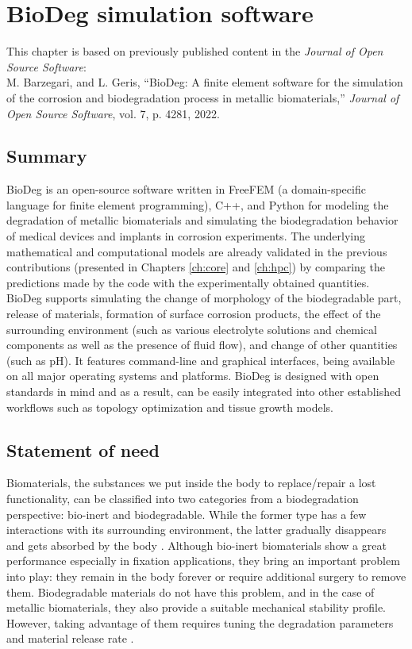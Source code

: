 \chapter{BioDeg simulation software}\label{ch:biodeg}


\begin{tcolorbox}
This chapter is based on previously published content in the \textit{Journal of Open Source Software}:\\
M. Barzegari, and L. Geris, ``BioDeg: A finite element software for the simulation of the corrosion and biodegradation process in metallic biomaterials,'' \textit{Journal of Open Source Software}, vol. 7, p. 4281, 2022.
\end{tcolorbox}

\section{Summary}

BioDeg is an open-source software written in FreeFEM (a domain-specific language for finite element programming), C++, and Python for modeling the degradation of metallic biomaterials and simulating the biodegradation behavior of medical devices and implants in corrosion experiments. The underlying mathematical and computational models are already validated in the previous contributions \cite{Barzegari2021, Barzegari2022} (presented in Chapters \ref{ch:core} and \ref{ch:hpc}) by comparing the predictions made by the code with the experimentally obtained quantities. BioDeg supports simulating the change of morphology of the biodegradable part, release of materials, formation of surface corrosion products, the effect of the surrounding environment (such as various electrolyte solutions and chemical components as well as the presence of fluid flow), and change of other quantities (such as pH). It features command-line and graphical interfaces, being available on all major operating systems and platforms. BioDeg is designed with open standards in mind and as a result, can be easily integrated into other established workflows such as topology optimization and tissue growth models.

\section{Statement of need}

Biomaterials, the substances we put inside the body to replace/repair a lost functionality, can be classified into two categories from a biodegradation perspective: bio-inert and biodegradable. While the former type has a few interactions with its surrounding environment, the latter gradually disappears and gets absorbed by the body \cite{Zheng2014, Chen2014}. Although bio-inert biomaterials show a great performance especially in fixation applications, they bring an important problem into play: they remain in the body forever or require additional surgery to remove them. Biodegradable materials do not have this problem, and in the case of metallic biomaterials, they also provide a suitable mechanical stability profile. However, taking advantage of them requires tuning the degradation parameters and material release rate \cite{Zhao2017}.

